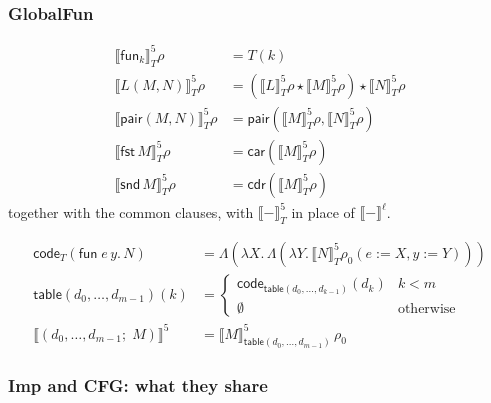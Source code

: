 \documentclass[10pt]{article}
\theoremstyle{acmplain}
\newcommand{\SEM}[1]{\llbracket #1 \rrbracket}
\newcommand{\key}[1]{\mathsf{#1}}
\newcommand{\funref}[1]{\key{fun}_{#1}}
\newcommand{\pair}[2]{\key{pair}(#1, #2)}
\newcommand{\FST}{\key{fst}\,}
\newcommand{\SND}{\key{snd}\,}
\newcommand{\app}{\star}
\begin{document}
\subsubsection{GlobalFun}

\begin{align*}
  \SEM{\funref{k}}^{\mathrm{5}}_T\rho &= T(k) \\
  \SEM{L(M, N)}^{\mathrm{5}}_T\rho &= (\SEM{L}^{\mathrm{5}}_T\rho \app \SEM{M}^{\mathrm{5}}_T\rho) \app \SEM{N}^{\mathrm{5}}_T\rho \\
  \SEM{\pair{M}{N}}^{\mathrm{5}}_T\rho &= \key{pair}(\SEM{M}^{\mathrm{5}}_T\rho, \SEM{N}^{\mathrm{5}}_T\rho) \\
  \SEM{\FST M}^{\mathrm{5}}_T\rho &= \key{car}(\SEM{M}^{\mathrm{5}}_T\rho) \\
  \SEM{\SND M}^{\mathrm{5}}_T\rho &= \key{cdr}(\SEM{M}^{\mathrm{5}}_T\rho)
\end{align*}
together with the common clauses, with $\SEM{-}^{\mathrm{5}}_T$ in place of $\SEM{-}^{\ell}$.

\begin{align*}
  \key{code}_T(\key{fun}\; e\,y.\,N) &= \Lambda(\lambda X.\, \Lambda(\lambda Y.\, \SEM{N}^{\mathrm{5}}_T\rho_0(e{:=}X, y{:=}Y))) \\[1ex]
  \key{table}(d_0,\ldots,d_{m-1})(k) &=
    \begin{cases}
      \key{code}_{\key{table}(d_0,\ldots,d_{k-1})}(d_k) & k < m \\
      \emptyset & \text{otherwise}
    \end{cases} \\[1ex]
  \SEM{(d_0, \ldots, d_{m-1};\; M)}^{\mathrm{5}} &= \SEM{M}^{\mathrm{5}}_{\key{table}(d_0,\ldots,d_{m-1})}\,\rho_0
\end{align*}

\subsubsection{Imp and CFG: what they share}
\end{document}
